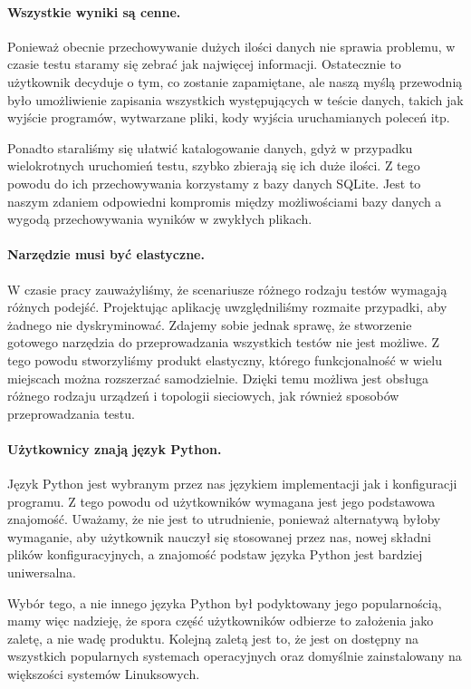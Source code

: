 \documentclass[00-praca-magisterska.tex]{subfiles}
\begin{document}

\paragraph{Wszystkie wyniki są cenne.} Ponieważ obecnie przechowywanie dużych
ilości danych nie sprawia problemu, w czasie testu staramy się zebrać jak
najwięcej informacji. Ostatecznie to użytkownik decyduje o tym, co zostanie
zapamiętane, ale naszą myślą przewodnią było umożliwienie zapisania wszystkich
występujących w teście danych, takich jak wyjście programów, wytwarzane pliki,
kody wyjścia uruchamianych poleceń itp.

Ponadto staraliśmy się ułatwić katalogowanie danych, gdyż w przypadku
wielokrotnych uruchomień testu, szybko zbierają się ich duże ilości. Z tego
powodu do ich przechowywania korzystamy z bazy danych SQLite. Jest to naszym
zdaniem odpowiedni kompromis między możliwościami bazy danych a wygodą
przechowywania wyników w zwykłych plikach.

\paragraph{Narzędzie musi być elastyczne.} W czasie pracy zauważyliśmy, że
scenariusze różnego rodzaju testów wymagają różnych podejść. Projektując
aplikację uwzględniliśmy rozmaite przypadki, aby żadnego nie dyskryminować.
Zdajemy sobie jednak sprawę, że stworzenie gotowego narzędzia do przeprowadzania
wszystkich testów nie jest możliwe. Z tego powodu stworzyliśmy produkt
elastyczny, którego funkcjonalność w wielu miejscach można rozszerzać
samodzielnie. Dzięki temu możliwa jest obsługa różnego rodzaju urządzeń i
topologii sieciowych, jak również sposobów przeprowadzania testu.

\paragraph{Użytkownicy znają język Python.} Język Python jest wybranym przez nas
językiem implementacji jak i konfiguracji programu. Z tego powodu od
użytkowników wymagana jest jego podstawowa znajomość. Uważamy, że nie jest to
utrudnienie, ponieważ alternatywą byłoby wymaganie, aby użytkownik nauczył się
stosowanej przez nas, nowej składni plików konfiguracyjnych, a znajomość podstaw
języka Python jest bardziej uniwersalna.

Wybór tego, a nie innego języka Python był podyktowany jego popularnością, mamy
więc nadzieję, że spora część użytkowników odbierze to założenia jako zaletę, a
nie wadę produktu. Kolejną zaletą jest to, że jest on dostępny na wszystkich
popularnych systemach operacyjnych oraz domyślnie zainstalowany na większości
systemów Linuksowych.
\end{document}
